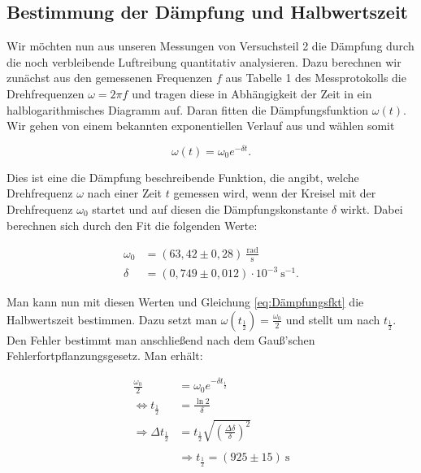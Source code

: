 \documentclass{article}
\begin{document}
\newpage
\subsection{Bestimmung der Dämpfung und Halbwertszeit} \label{AuswertungDämpfung}

Wir möchten nun aus unseren Messungen von Versuchsteil 2 die Dämpfung durch die noch verbleibende Luftreibung quantitativ analysieren. Dazu berechnen wir zunächst aus den gemessenen Frequenzen $f$ aus Tabelle 1 des Messprotokolls die Drehfrequenzen $\omega = 2 \pi f$ und tragen diese in Abhängigkeit der Zeit in ein halblogarithmisches Diagramm auf. Daran fitten die Dämpfungsfunktion $\omega(t)$. Wir gehen von einem bekannten exponentiellen Verlauf aus und wählen somit

\begin{equation}
    \omega(t) = \omega_0 e^{- \delta t}.
    \label{eq:Dämpfungsfkt}
\end{equation}

Dies ist eine die Dämpfung beschreibende Funktion, die angibt, welche Drehfrequenz $\omega$ nach einer Zeit $t$ gemessen wird, wenn der Kreisel mit der Drehfrequenz $\omega_0$ startet und auf diesen die Dämpfungskonstante $\delta$ wirkt. Dabei berechnen sich durch den Fit die folgenden Werte:

\begin{equation}
    \begin{split}
        \omega_0 &= (63,42 \pm 0,28) \ \frac{\text{rad}}{\text{s}} \\
        \delta &= (0,749 \pm 0,012) \cdot 10^{-3} \ \text{s}^{-1}.
    \end{split}
\end{equation}

Man kann nun mit diesen Werten und Gleichung \ref{eq:Dämpfungsfkt} die Halbwertszeit bestimmen. Dazu setzt man $\omega(t_{\frac{1}{2}}) = \frac{\omega_0}{2}$ und stellt um nach $t_{\frac{1}{2}}$. Den Fehler bestimmt man anschließend nach dem Gauß'schen Fehlerfortpflanzungsgesetz. Man erhält:

\begin{equation}
    \begin{split}
        \frac{\omega_0}{2} &= \omega_0 e^{- \delta t_{\frac{1}{2}}} \\
        \iff t_{\frac{1}{2}} &= \frac{\ln{2}}{\delta} \\
        \Rightarrow \Delta t_{\frac{1}{2}} &= t_{\frac{1}{2}} \sqrt{\left( \frac{\Delta \delta}{\delta} \right)^2} \\ \\
        &\Rightarrow t_{\frac{1}{2}} = (925 \pm 15) \ \text{s}
    \end{split}
\end{equation}
\end{document}
